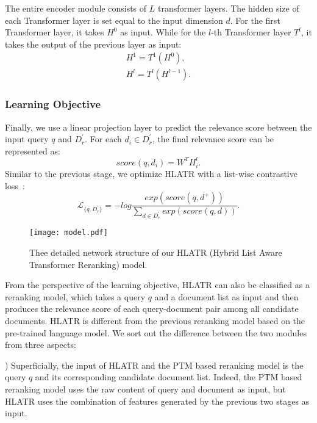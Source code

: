 \documentclass[11pt]{article}
\begin{document}
The entire encoder module consists of $L$ transformer layers. The hidden size of each Transformer layer is set equal to the input dimension $d$. For the first Transformer layer, it takes $H^0$ as input. While for the $l$-th Transformer layer $T^{l}$, it takes the output of the previous layer as input:
\begin{align*}
    H^{1} = T^1(H^0), \\
    H^{l} = T^l(H^{l-1}).
\end{align*}


\subsubsection{Learning Objective}
\label{sec:loss}
Finally, we use a linear projection layer to predict the relevance score between the input query $q$ and $D_r^{'}$. For each $d_i \in D_r^{'}$, the final relevance score can be represented as: 
\begin{equation}
    score(q, d_i) = W^TH^l_i.
\end{equation}
Similar to the previous stage,  we optimize HLATR with a list-wise contrastive loss~\cite{gao2021rethink}:
\begin{equation}
   \mathcal{L}_{\{q, D_r^{'}\}} = -log\frac{exp(score(q, d^{+}))}{\sum_{d\in D_r^{'}} exp(score(q, d))} .
\end{equation}

\begin{figure}[t]
    \centering
    \texttt{[image: model.pdf]}   
    \caption{Thee detailed network structure of our HLATR (Hybrid List Aware Transformer Reranking) model.}
    \label{fig:hltar}
\end{figure}

From the perspective of the learning objective, HLATR can also be classified as a reranking model, which takes a query $q$ and a document list as input and then produces the relevance score of each query-document pair among all candidate documents. HLATR is different from the previous reranking model based on the pre-trained language model. We sort out the difference between the two modules from three aspects:

) Superficially, the input of HLATR and the PTM based reranking model is the query $q$ and its corresponding candidate document list. Indeed, the PTM based reranking model uses the raw content of query and document as input, but HLATR uses the combination of features generated by the previous two stages as input. 
\end{document}
